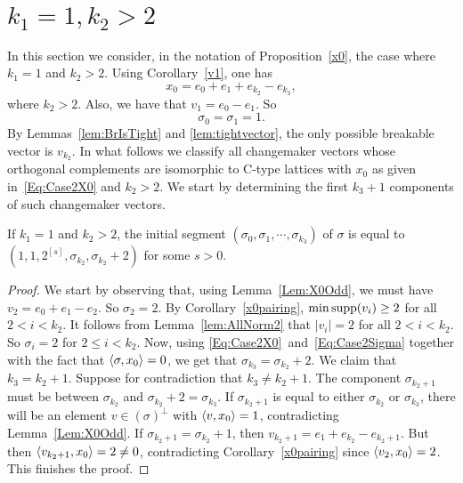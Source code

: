 \section{{\bf $k_1=1, k_2>2$}}\label{sec:Case2}

In this section we consider, in the notation of Proposition~\ref{x0}, the case where $k_1=1$ and $k_2>2$. Using Corollary~\ref{v1}, one has
\begin{equation}\label{Eq:Case2X0}
x_0=e_0 + e_1 + e_{k_2} - e_{k_3}, 
\end{equation}
where $k_2>2$. 
Also, we have that $v_1 = e_0 - e_1$. So 
\begin{equation}\label{Eq:Case2Sigma}
\sigma_0 = \sigma_1 = 1.
\end{equation} 
By Lemmas~\ref{lem:BrIsTight} and \ref{lem:tightvector}, the only possible breakable vector is $v_{k_2}$.
In what follows we classify all changemaker vectors whose orthogonal complements are isomorphic to C-type lattices with $x_0$ as given in~\eqref{Eq:Case2X0} and $k_2>2$. We start by determining the first $k_3+1$ components of such changemaker vectors.  

\begin{prop}\label{prop:Segk_1=1k_2>2}
If $k_1 = 1$ and $k_2 > 2$, the initial segment $(\sigma_0,\sigma_1,\cdots,\sigma_{k_3})$ of $\sigma$ is equal to $(1,1,2^{[s]}, \sigma_{k_2},\sigma_{k_2} + 2)$ for some $s > 0$.
\end{prop}
\begin{proof}
We start by observing that, using Lemma~\ref{Lem:X0Odd}, we must have $v_2 = e_0 + e_1 - e_2$. So $\sigma_2 = 2$. By Corollary~\ref{x0pairing}, $\min\operatorname{supp}(v_i)\ge2$ for all $2 < i < k_2$. It follows from Lemma~\ref{lem:AllNorm2} that $|v_i| = 2$ for all $2 < i < k_2$. So $\sigma_i = 2$ for $2 \le i < k_2$. Now, using \eqref{Eq:Case2X0}~and~\eqref{Eq:Case2Sigma} together with the fact that $\left\langle \sigma , x_0 \right\rangle = 0$, we get that $\sigma_{k_3} = \sigma_{k_2} + 2$. We claim that $k_3 = k_2 +1$. Suppose for contradiction that $k_3 \neq k_2 +1$. The component $\sigma_{k_2 + 1}$ must be between $\sigma_{k_2}$ and $\sigma_{k_2} + 2 = \sigma_{k_3}$. If $\sigma_{k_2 + 1}$ is equal to either $\sigma_{k_2}$ or $\sigma_{k_3}$, there will be an element $v \in (\sigma)^\perp$ with $\left\langle v , x_0 \right\rangle = 1$, contradicting Lemma~\ref{Lem:X0Odd}. If $\sigma_{k_2 + 1} = \sigma_{k_2} + 1$, then $v_{k_2 + 1} = e_1 + e_{k_2} - e_{k_2 + 1}$. But then $\left\langle v_{k_2 + 1} , x_0 \right\rangle = 2 \neq 0$, contradicting Corollary~\ref{x0pairing} since $\left\langle v_2 , x_0 \right\rangle = 2$. This finishes the proof.
\end{proof}

